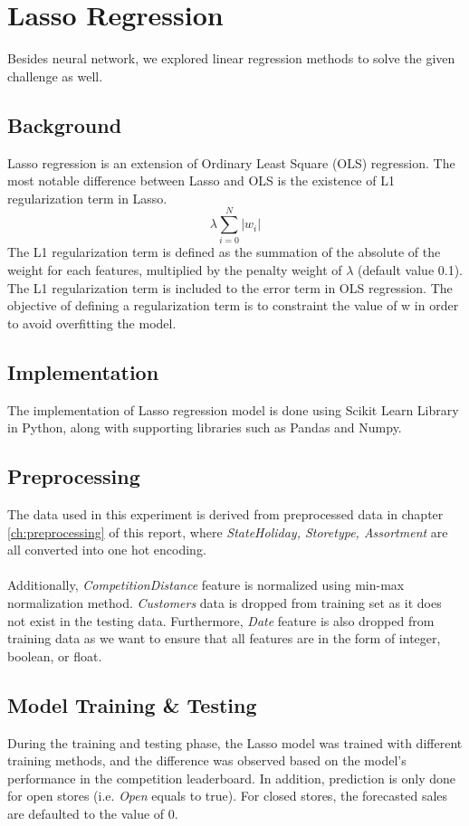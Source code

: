 \section{Lasso Regression} \label{sec:lasso}
Besides neural network, we explored linear regression methods to solve the given challenge as well.

\subsection{Background}
Lasso regression is an extension of Ordinary Least Square (OLS) regression. The most notable difference between Lasso and OLS is the existence of L1 regularization term in Lasso.
\begin{equation}
\label{eq:l1_regularization}
\lambda \sum_{i=0}^{N} |w_i|
\end{equation}
The L1 regularization term is defined as the summation of the absolute of the weight for each features, multiplied by the penalty weight of $\lambda$ (default value 0.1). The L1 regularization term is included to the error term in OLS regression. The objective of defining a regularization term is to constraint the value of w in order to avoid overfitting the model.

\subsection{Implementation}
The implementation of Lasso regression model is done using Scikit Learn Library in Python, along with supporting libraries such as Pandas and Numpy.

\subsection{Preprocessing}
The data used in this experiment is derived from preprocessed data in chapter \ref{ch:preprocessing} of this report, where \textit{StateHoliday, Storetype, Assortment} are all converted into one hot encoding. \\ \\

Additionally, \textit{CompetitionDistance} feature is normalized using min-max normalization method. \textit{Customers} data is dropped from training set as it does not exist in the testing data. Furthermore, \textit{Date} feature is also dropped from training data as we want to ensure that all features are in the form of integer, boolean, or float.

\subsection{Model Training \& Testing}
During the training and testing phase, the Lasso model was trained with different training methods, and the difference was observed based on the model's performance in the competition leaderboard. In addition, prediction is only done for open stores (i.e. \textit{Open} equals to true). For closed stores, the forecasted sales are defaulted to the value of 0.

